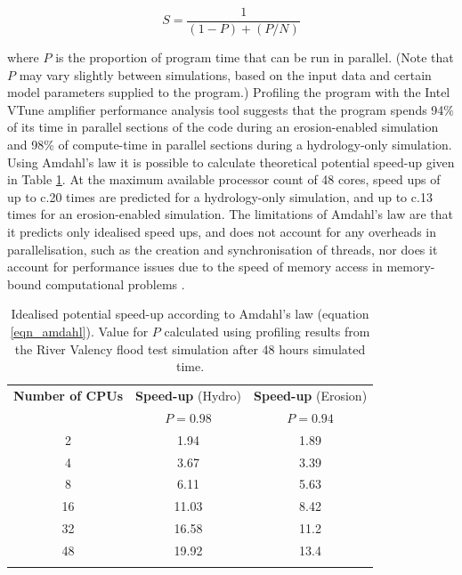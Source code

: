 \begin{equation}
S = \frac{1}{(1-P)+(P/N)}
\label{eqn_amdahl}
\end{equation}

\noindent
where \(P\) is the proportion of program time that can be run in parallel. (Note that \(P\) may vary slightly between simulations, based on the input data and certain model parameters supplied to the program.) Profiling the program with the Intel VTune amplifier performance analysis tool suggests that the program spends 94\% of its time in parallel sections of the code during an erosion-enabled simulation and 98\% of compute-time in parallel sections during a hydrology-only simulation. Using Amdahl's law it is possible to calculate theoretical potential speed-up given in Table \ref{Amdahl_table}. At the maximum available processor count of 48 cores, speed ups of up to c.20 times are predicted for a hydrology-only simulation, and up to c.13 times for an erosion-enabled simulation. The limitations of Amdahl's law are that it predicts only idealised speed ups, and does not account for any overheads in parallelisation, such as the creation and synchronisation of threads, nor does it account for performance issues due to the speed of memory access in memory-bound computational problems \citep{hill2008amdahl,sun2010reevaluating}.

\begin{table}
\caption{Idealised potential speed-up according to Amdahl's law (equation \ref{eqn_amdahl}). Value for \(P\) calculated using profiling results from the River Valency flood test simulation after 48 hours simulated time.}
\begin{tabular}{ccc}
\textbf{Number of CPUs} & \textbf{Speed-up} (Hydro) & \textbf{Speed-up} (Erosion) \\

 & \(P=0.98\) & \(P=0.94\) \\
\hline 
2 & 1.94 & 1.89  \\ 
4 & 3.67 & 3.39  \\ 
8 & 6.11 &5.63  \\ 
16 & 11.03 & 8.42 \\ 
32 & 16.58 & 11.2 \\ 
48 & 19.92 & 13.4 \\ 
\hline \\
\end{tabular}

\label{Amdahl_table} 
\end{table}



